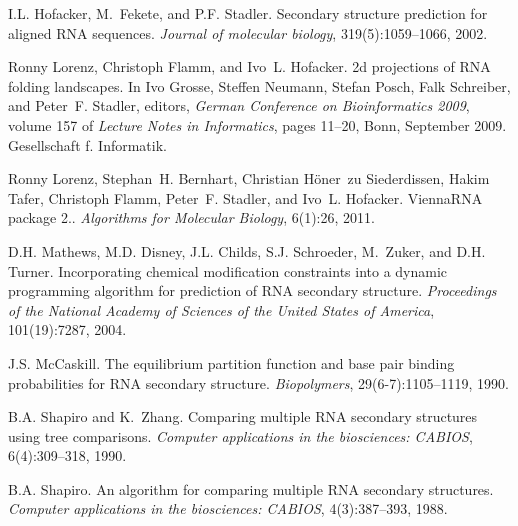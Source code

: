 \begin{DoxyDescription}
\item[\label{_CITEREF_hofacker:2002}%
\mbox{[}9\mbox{]}]I.\+L. Hofacker, M.~Fekete, and P.\+F. Stadler. Secondary structure prediction for aligned R\+NA sequences. {\itshape Journal of molecular biology}, 319(5)\+:1059--1066, 2002.


\item[\label{_CITEREF_lorenz:2009}%
\mbox{[}10\mbox{]}]Ronny Lorenz, Christoph Flamm, and Ivo~L. Hofacker. 2d projections of R\+NA folding landscapes. In Ivo Grosse, Steffen Neumann, Stefan Posch, Falk Schreiber, and Peter~F. Stadler, editors, {\itshape German Conference on Bioinformatics 2009}, volume 157 of {\itshape Lecture Notes in Informatics}, pages 11--20, Bonn, September 2009. Gesellschaft f. Informatik.


\item[\label{_CITEREF_lorenz:2011}%
\mbox{[}11\mbox{]}]Ronny Lorenz, Stephan~H. Bernhart, Christian H\"{o}ner~zu Siederdissen, Hakim Tafer, Christoph Flamm, Peter~F. Stadler, and Ivo~L. Hofacker. Vienna\+R\+NA package 2.. {\itshape Algorithms for Molecular Biology}, 6(1)\+:26, 2011. 


\item[\label{_CITEREF_mathews:2004}%
\mbox{[}12\mbox{]}]D.\+H. Mathews, M.\+D. Disney, J.\+L. Childs, S.\+J. Schroeder, M.~Zuker, and D.\+H. Turner. Incorporating chemical modification constraints into a dynamic programming algorithm for prediction of R\+NA secondary structure. {\itshape Proceedings of the National Academy of Sciences of the United States of America}, 101(19)\+:7287, 2004.


\item[\label{_CITEREF_mccaskill:1990}%
\mbox{[}13\mbox{]}]J.\+S. Mc\+Caskill. The equilibrium partition function and base pair binding probabilities for R\+NA secondary structure. {\itshape Biopolymers}, 29(6-\/7)\+:1105--1119, 1990.


\item[\label{_CITEREF_shapiro:1990}%
\mbox{[}14\mbox{]}]B.\+A. Shapiro and K.~Zhang. Comparing multiple R\+NA secondary structures using tree comparisons. {\itshape Computer applications in the biosciences\+: C\+A\+B\+I\+OS}, 6(4)\+:309--318, 1990.


\item[\label{_CITEREF_shapiro:1988}%
\mbox{[}15\mbox{]}]B.\+A. Shapiro. An algorithm for comparing multiple R\+NA secondary structures. {\itshape Computer applications in the biosciences\+: C\+A\+B\+I\+OS}, 4(3)\+:387--393, 1988.



\end{DoxyDescription}
